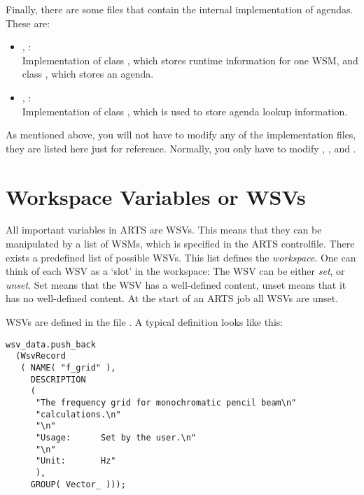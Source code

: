 Finally, there are some files that contain the internal implementation
of agendas. These are:
\begin{itemize}
\item {}, :\\
  Implementation of class , which stores runtime
  information for one WSM, and class , which stores
  an agenda.
\item {}, :\\
  Implementation of class , which is used to store
  agenda lookup information.
\end{itemize}
  

\vspace{2ex} As mentioned above, you will not have to modify any of
the implementation files, they are listed here just for reference.
Normally, you only have to modify ,
, and .

\section{Workspace Variables or WSVs}
\label{sec:agendas:wsvs}

All important variables in ARTS are WSVs. This means that they can be
manipulated by a list of WSMs, which is specified in the ARTS
controlfile. There exists a predefined list of possible WSVs. This
list defines the \emph{workspace}. One can think of each WSV as a
`slot' in the workspace: The WSV can be either \emph{set}, or
\emph{unset}. Set means that the WSV has a well-defined content, unset
means that it has no well-defined content. At the start of an ARTS job
all WSVs are unset.

WSVs are defined in the file . A typical
definition looks like this:

{\small
\begin{verbatim}
wsv_data.push_back
  (WsvRecord
   ( NAME( "f_grid" ),
     DESCRIPTION
     (
      "The frequency grid for monochromatic pencil beam\n"
      "calculations.\n"
      "\n"
      "Usage:      Set by the user.\n"
      "\n"
      "Unit:       Hz"
      ),
     GROUP( Vector_ )));
\end{verbatim}
}

